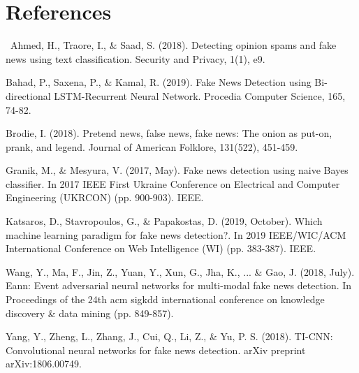 \documentclass{article}
\begin{document}

\section{References}

\quad \, Ahmed, H., Traore, I., \& Saad, S. (2018). Detecting opinion spams and fake news using text classification. Security and Privacy, 1(1), e9.

Bahad, P., Saxena, P., \& Kamal, R. (2019). Fake News Detection using Bi-directional LSTM-Recurrent Neural Network. Procedia Computer Science, 165, 74-82.

Brodie, I. (2018). Pretend news, false news, fake news: The onion as put-on, prank, and legend. Journal of American Folklore, 131(522), 451-459.

Granik, M., & Mesyura, V. (2017, May). Fake news detection using naive Bayes classifier. In 2017 IEEE First Ukraine Conference on Electrical and Computer Engineering (UKRCON) (pp. 900-903). IEEE.

Katsaros, D., Stavropoulos, G., & Papakostas, D. (2019, October). Which machine learning paradigm for fake news detection?. In 2019 IEEE/WIC/ACM International Conference on Web Intelligence (WI) (pp. 383-387). IEEE.

Wang, Y., Ma, F., Jin, Z., Yuan, Y., Xun, G., Jha, K., ... \& Gao, J. (2018, July). Eann: Event adversarial neural networks for multi-modal fake news detection. In Proceedings of the 24th acm sigkdd international conference on knowledge discovery & data mining (pp. 849-857).

Yang, Y., Zheng, L., Zhang, J., Cui, Q., Li, Z., \& Yu, P. S. (2018). TI-CNN: Convolutional neural networks for fake news detection. arXiv preprint arXiv:1806.00749.
\end{document}
